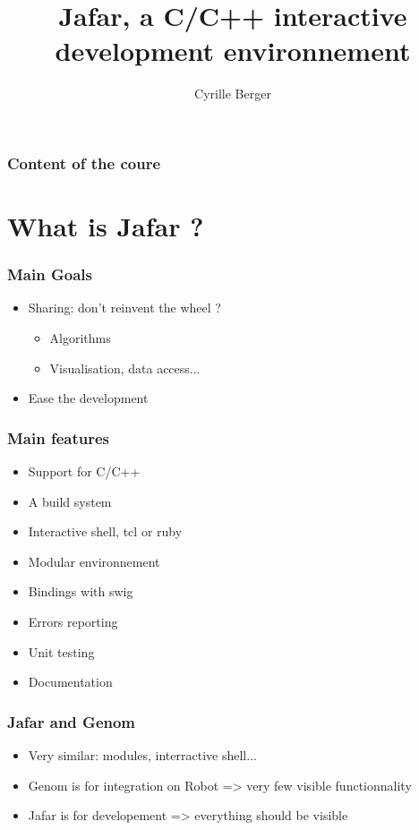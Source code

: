 \documentclass[compress]{beamer}
\title{Jafar, a C/C++ interactive development environnement}
\author{Cyrille Berger}
\begin{document}
\begin{frame}
  \titlepage
\end{frame}

\begin{frame}
  \frametitle{Content of the coure}
  \tableofcontents
\end{frame}


\section{What is Jafar ?}
\begin{frame}
  \frametitle{Main Goals}
  \begin{itemize}
   \item<1-> Sharing: don't reinvent the wheel ?
    \begin{itemize}
     \item<2-> Algorithms
     \item<3-> Visualisation, data access...
    \end{itemize}
   \item<4-> Ease the development
  \end{itemize}
\end{frame}

\begin{frame}
 \frametitle{Main features}
 \begin{itemize}
  \item<1-> Support for C/C++
  \item<2-> A build system
  \item<3-> Interactive shell, tcl or ruby
  \item<4-> Modular environnement
  \item<5-> Bindings with swig
  \item<6-> Errors reporting
  \item<7-> Unit testing
  \item<8-> Documentation
 \end{itemize}
\end{frame}

\begin{frame}
 \frametitle{Jafar and Genom}
 \begin{itemize}
  \item<1-> Very similar: modules, interractive shell...
  \item<2-> Genom is for integration on Robot => very few visible
functionnality
  \item<3-> Jafar is for developement => everything should be visible
 \end{itemize}
\end{frame}
\end{document}
